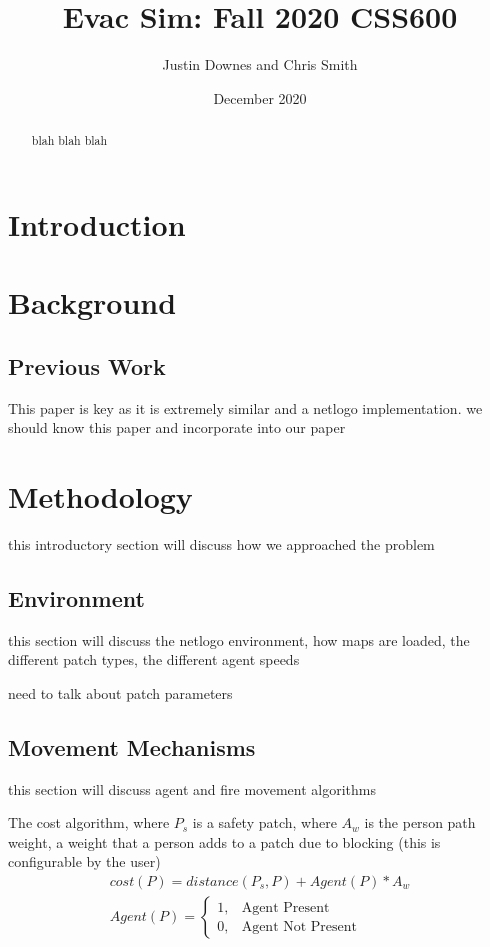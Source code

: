 \documentclass[12pt,letterpaper]{article}
\begin{document}
\title{Evac Sim: Fall 2020 CSS600 }

\author{Justin Downes and Chris Smith}
\date{December 2020}
\maketitle

\begin{abstract}
blah blah blah

\end{abstract}
\section {Introduction}



\section {Background}
\subsection{Previous Work}
\cite{almeidaCrowdSimulationModeling2013} 
\cite{kneidl}
\cite{kuligowskil}
\cite{abmEvac}
\cite{zhouSimulationPedestrianEvacuation2019}

This paper is key as it is extremely similar and a netlogo implementation.  we should know this paper and incorporate into our paper \cite{prioritEvac}

\section {Methodology}
this introductory section will discuss how we approached the problem
\subsection{Environment}
this section will discuss the netlogo environment, how maps are loaded, the different patch types, the different agent speeds

need to talk about patch parameters
\subsection{Movement Mechanisms}
this section will discuss agent and fire movement algorithms

The cost algorithm, where $P_s$ is a safety patch, where $A_w$ is the person path weight, a weight that a person adds to a patch due to blocking (this is configurable by the user)
\begin{align}
cost(P)  = distance(P_s, P) + Agent(P) * A_w \nonumber \\
Agent(P)=
\begin{cases}
1, & \text{Agent Present}  \\
0, & \text{Agent Not Present} 
\end{cases}
\end{align}
\end{document}
